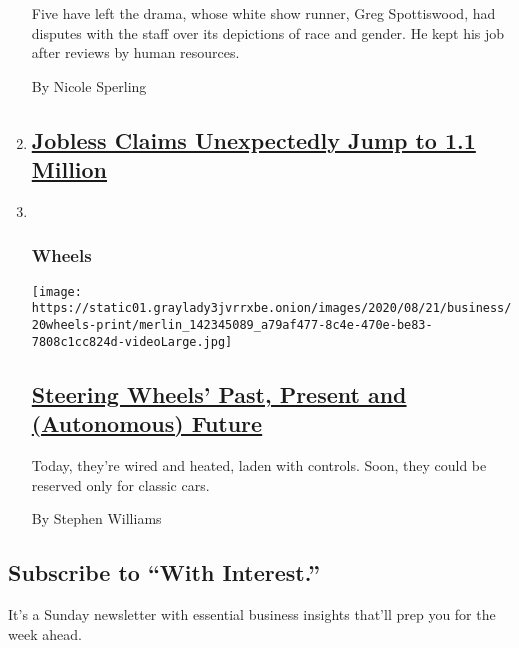 \begin{enumerate}
  Five have left the drama, whose white show runner, Greg Spottiswood,
  had disputes with the staff over its depictions of race and gender. He
  kept his job after reviews by human resources.

  By Nicole Sperling
\item
  \hypertarget{jobless-claims-unexpectedly-jump-to-11-million}{%
  \subsection{\texorpdfstring{\href{https://www.nytimes3xbfgragh.onion/live/2020/08/20/business/stock-market-today-coronavirus}{Jobless
  Claims Unexpectedly Jump to 1.1
  Million}}{Jobless Claims Unexpectedly Jump to 1.1 Million}}\label{jobless-claims-unexpectedly-jump-to-11-million}}
\item ~
  \hypertarget{wheels}{%
  \subsubsection{Wheels}\label{wheels}}

  \texttt{[image: https://static01.graylady3jvrrxbe.onion/images/2020/08/21/business/20wheels-print/merlin\_142345089\_a79af477-8c4e-470e-be83-7808c1cc824d-videoLarge.jpg]}

  \hypertarget{steering-wheels-past-present-and-autonomous-future}{%
  \subsection{\texorpdfstring{\href{/2020/08/20/business/steering-wheels-history.html}{Steering
  Wheels' Past, Present and (Autonomous)
  Future}}{Steering Wheels' Past, Present and (Autonomous) Future}}\label{steering-wheels-past-present-and-autonomous-future}}

  Today, they're wired and heated, laden with controls. Soon, they could
  be reserved only for classic cars.

  By Stephen Williams
\end{enumerate}

\hypertarget{subscribe-to-with-interest}{%
\subsection{Subscribe to ``With
Interest.''}\label{subscribe-to-with-interest}}

It's a Sunday newsletter with essential business insights that'll prep
you for the week ahead.

